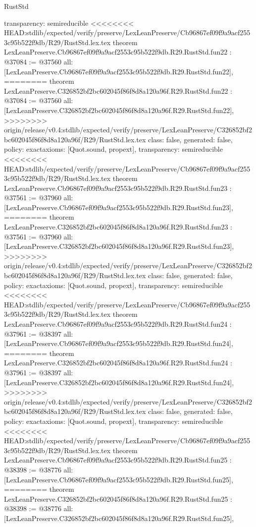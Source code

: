 \begin{lexlean}{RustStd}
\begin{coremodule}
{\begin{coremodule}
{{{{{{{{{{{{{{{{{{{{{{{{{  transparency: semireducible
}
<<<<<<<< HEAD:stdlib/expected/verify/preserve/LexLeanPreserve/Cb96867ef09f9a9acf2553c95b522f9db/R29/RustStd.lex.tex
theorem LexLeanPreserve.Cb96867ef09f9a9acf2553c95b522f9db.R29.RustStd.fun22 : @37084 := @37560 {
  all: [LexLeanPreserve.Cb96867ef09f9a9acf2553c95b522f9db.R29.RustStd.fun22],
========
theorem LexLeanPreserve.C326852bf2bc602045f86f8d8a120a96f.R29.RustStd.fun22 : @37084 := @37560 {
  all: [LexLeanPreserve.C326852bf2bc602045f86f8d8a120a96f.R29.RustStd.fun22],
>>>>>>>> origin/release/v0.4:stdlib/expected/verify/preserve/LexLeanPreserve/C326852bf2bc602045f86f8d8a120a96f/R29/RustStd.lex.tex
  class: false,
  generated: false,
  policy: exact{axioms: [Quot.sound, propext]},
  transparency: semireducible
}
<<<<<<<< HEAD:stdlib/expected/verify/preserve/LexLeanPreserve/Cb96867ef09f9a9acf2553c95b522f9db/R29/RustStd.lex.tex
theorem LexLeanPreserve.Cb96867ef09f9a9acf2553c95b522f9db.R29.RustStd.fun23 : @37561 := @37960 {
  all: [LexLeanPreserve.Cb96867ef09f9a9acf2553c95b522f9db.R29.RustStd.fun23],
========
theorem LexLeanPreserve.C326852bf2bc602045f86f8d8a120a96f.R29.RustStd.fun23 : @37561 := @37960 {
  all: [LexLeanPreserve.C326852bf2bc602045f86f8d8a120a96f.R29.RustStd.fun23],
>>>>>>>> origin/release/v0.4:stdlib/expected/verify/preserve/LexLeanPreserve/C326852bf2bc602045f86f8d8a120a96f/R29/RustStd.lex.tex
  class: false,
  generated: false,
  policy: exact{axioms: [Quot.sound, propext]},
  transparency: semireducible
}
<<<<<<<< HEAD:stdlib/expected/verify/preserve/LexLeanPreserve/Cb96867ef09f9a9acf2553c95b522f9db/R29/RustStd.lex.tex
theorem LexLeanPreserve.Cb96867ef09f9a9acf2553c95b522f9db.R29.RustStd.fun24 : @37961 := @38397 {
  all: [LexLeanPreserve.Cb96867ef09f9a9acf2553c95b522f9db.R29.RustStd.fun24],
========
theorem LexLeanPreserve.C326852bf2bc602045f86f8d8a120a96f.R29.RustStd.fun24 : @37961 := @38397 {
  all: [LexLeanPreserve.C326852bf2bc602045f86f8d8a120a96f.R29.RustStd.fun24],
>>>>>>>> origin/release/v0.4:stdlib/expected/verify/preserve/LexLeanPreserve/C326852bf2bc602045f86f8d8a120a96f/R29/RustStd.lex.tex
  class: false,
  generated: false,
  policy: exact{axioms: [Quot.sound, propext]},
  transparency: semireducible
}
<<<<<<<< HEAD:stdlib/expected/verify/preserve/LexLeanPreserve/Cb96867ef09f9a9acf2553c95b522f9db/R29/RustStd.lex.tex
theorem LexLeanPreserve.Cb96867ef09f9a9acf2553c95b522f9db.R29.RustStd.fun25 : @38398 := @38776 {
  all: [LexLeanPreserve.Cb96867ef09f9a9acf2553c95b522f9db.R29.RustStd.fun25],
========
theorem LexLeanPreserve.C326852bf2bc602045f86f8d8a120a96f.R29.RustStd.fun25 : @38398 := @38776 {
  all: [LexLeanPreserve.C326852bf2bc602045f86f8d8a120a96f.R29.RustStd.fun25],
}}}}}}}}}}}}}}}}}}}}}}}}}}}}}
\end{coremodule}}
\end{coremodule}
\end{lexlean}
